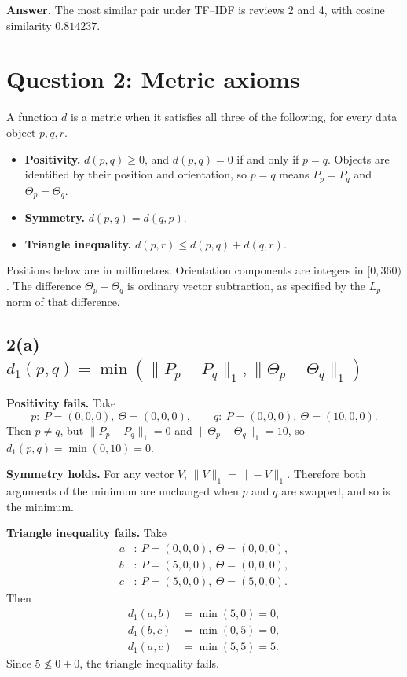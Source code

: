 \documentclass[11pt]{article}
\begin{document}
\textbf{Answer.} The most similar pair under TF--IDF is reviews 2 and 4, with cosine similarity $0.814237$.

\section{Question 2: Metric axioms}

A function $d$ is a metric when it satisfies all three of the following, for every data object $p,q,r$.
\begin{itemize}
  \item \textbf{Positivity.} $d(p,q)\ge 0$, and $d(p,q)=0$ if and only if $p=q$. Objects are identified by their position and orientation, so $p=q$ means $P_p=P_q$ and $\Theta_p=\Theta_q$.
  \item \textbf{Symmetry.} $d(p,q)=d(q,p)$.
  \item \textbf{Triangle inequality.} $d(p,r)\le d(p,q)+d(q,r)$.
\end{itemize}
Positions below are in millimetres. Orientation components are integers in $[0,360)$. The difference $\Theta_p-\Theta_q$ is ordinary vector subtraction, as specified by the $L_p$ norm of that difference.

\subsection*{2(a) $d_1(p,q)=\min(\|P_p-P_q\|_1,\|\Theta_p-\Theta_q\|_1)$}

\textbf{Positivity fails.} Take
\[
p:\ P=(0,0,0),\ \Theta=(0,0,0),
\qquad
q:\ P=(0,0,0),\ \Theta=(10,0,0).
\]
Then $p\neq q$, but $\|P_p-P_q\|_1=0$ and $\|\Theta_p-\Theta_q\|_1=10$, so $d_1(p,q)=\min(0,10)=0$.

\textbf{Symmetry holds.} For any vector $V$, $\|V\|_1=\|-V\|_1$. Therefore both arguments of the minimum are unchanged when $p$ and $q$ are swapped, and so is the minimum.

\textbf{Triangle inequality fails.} Take
\begin{align*}
a&:\ P=(0,0,0),\ \Theta=(0,0,0),\\
b&:\ P=(5,0,0),\ \Theta=(0,0,0),\\
c&:\ P=(5,0,0),\ \Theta=(5,0,0).
\end{align*}
Then
\begin{align*}
d_1(a,b)&=\min(5,0)=0,\\
d_1(b,c)&=\min(0,5)=0,\\
d_1(a,c)&=\min(5,5)=5.
\end{align*}
Since $5\not\le 0+0$, the triangle inequality fails.
\end{document}
